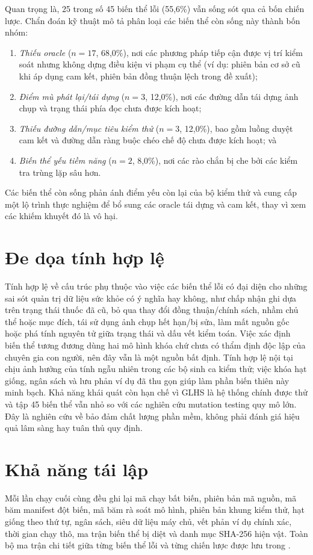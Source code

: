 \documentclass[11pt]{article}
\begin{document}
Quan trọng là, 25 trong số 45 biến thể lỗi (55,6\%) vẫn sống sót qua cả bốn chiến lược. Chẩn đoán kỹ thuật mô tả phân loại các biến thể còn sống này thành bốn nhóm:
\begin{enumerate}
    \item \emph{Thiếu oracle} ($n=17$, 68,0\%), nơi các phương pháp tiếp cận được vị trí kiểm soát nhưng không dựng điều kiện vi phạm cụ thể (ví dụ: phiên bản cơ sở cũ khi áp dụng cam kết, phiên bản đồng thuận lệch trong đề xuất);
    \item \emph{Điểm mù phát lại/tái dựng} ($n=3$, 12,0\%), nơi các đường dẫn tái dựng ảnh chụp và trạng thái phía đọc chưa được kích hoạt;
    \item \emph{Thiếu đường dẫn/mục tiêu kiểm thử} ($n=3$, 12,0\%), bao gồm luồng duyệt cam kết và đường dẫn ràng buộc chéo chế độ chưa được kích hoạt; và
    \item \emph{Biến thể yếu tiềm năng} ($n=2$, 8,0\%), nơi các rào chắn bị che bởi các kiểm tra trùng lặp sâu hơn.
\end{enumerate}
Các biến thể còn sống phản ánh điểm yếu còn lại của bộ kiểm thử và cung cấp một lộ trình thực nghiệm để bổ sung các oracle tái dựng và cam kết, thay vì xem các khiếm khuyết đó là vô hại.

\section{Đe dọa tính hợp lệ}
Tính hợp lệ về cấu trúc phụ thuộc vào việc các biến thể lỗi có đại diện cho những sai sót quản trị dữ liệu sức khỏe có ý nghĩa hay không, như chấp nhận ghi dựa trên trạng thái thuốc đã cũ, bỏ qua thay đổi đồng thuận/chính sách, nhầm chủ thể hoặc mục đích, tái sử dụng ảnh chụp hết hạn/bị sửa, làm mất nguồn gốc hoặc phá tính nguyên tử giữa trạng thái và dấu vết kiểm toán. Việc xác định biến thể tương đương dùng hai mô hình khóa chứ chưa có thẩm định độc lập của chuyên gia con người, nên đây vẫn là một nguồn bất định. Tính hợp lệ nội tại chịu ảnh hưởng của tính ngẫu nhiên trong các bộ sinh ca kiểm thử; việc khóa hạt giống, ngân sách và lưu phản ví dụ đã thu gọn giúp làm phần biến thiên này minh bạch. Khả năng khái quát còn hạn chế vì GLHS là hệ thống chính được thử và tập 45 biến thể vẫn nhỏ so với các nghiên cứu mutation testing quy mô lớn. Đây là nghiên cứu về bảo đảm chất lượng phần mềm, không phải đánh giá hiệu quả lâm sàng hay tuân thủ quy định.

\section{Khả năng tái lập}
Mỗi lần chạy cuối cùng đều ghi lại mã chạy bất biến, phiên bản mã nguồn, mã băm manifest đột biến, mã băm rà soát mô hình, phiên bản khung kiểm thử, hạt giống theo thứ tự, ngân sách, siêu dữ liệu máy chủ, vết phản ví dụ chính xác, thời gian chạy thô, ma trận biến thể bị diệt và danh mục SHA-256 hiện vật. Toàn bộ ma trận chi tiết giữa từng biến thể lỗi và từng chiến lược được lưu trong .
\end{document}

